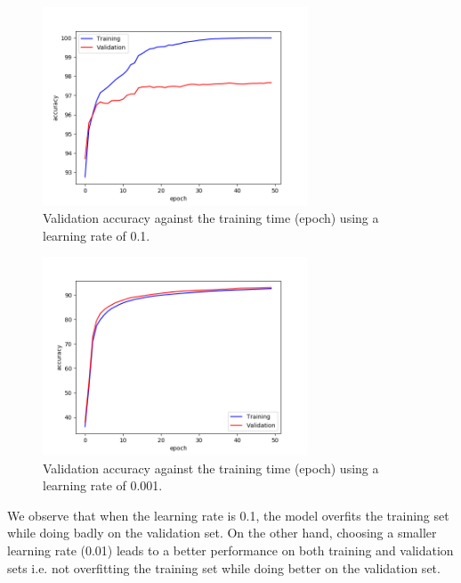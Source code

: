 \documentclass[a4paper]{article}
\begin{document}
\begin{enumerate}
\begin{figure}
\centering
\includegraphics[width=0.7\textwidth]{lr2.png}
\caption{\label{fig:lr2}Validation accuracy against the training time (epoch) using a learning rate of 0.1.}
\end{figure}

\begin{figure}
\centering
\includegraphics[width=0.7\textwidth]{lr3.png}
\caption{\label{fig:lr3}Validation accuracy against the training time (epoch) using a learning rate of 0.001.}
\end{figure}

We observe that when the learning rate is 0.1, the model overfits the training set while doing badly on the validation set. On the other hand, choosing a smaller learning rate (0.01) leads to a better performance on both training and validation sets i.e. not overfitting the training set while doing better on the validation set. 


\end{enumerate}
\end{document}

